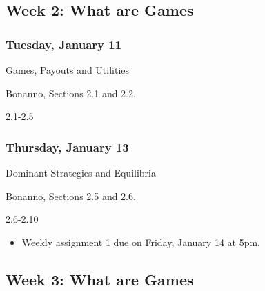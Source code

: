 \documentclass[
]{article}
\providecommand{\tightlist}{%
  \setlength{\itemsep}{0pt}\setlength{\parskip}{0pt}}
\begin{document}
\hypertarget{week-2-what-are-games}{%
\subsection{Week 2: What are Games}\label{week-2-what-are-games}}

\begin{multicols}{2}

\hypertarget{tuesday-january-11}{%
\subsubsection{Tuesday, January 11}\label{tuesday-january-11}}

\begin{description}
\tightlist
\item[Topic]
Games, Payouts and Utilities
\item[Reading]
Bonanno, Sections 2.1 and 2.2.
\item[Video lectures]
2.1-2.5
\end{description}

\hypertarget{thursday-january-13}{%
\subsubsection{Thursday, January 13}\label{thursday-january-13}}

\begin{description}
\tightlist
\item[Topic]
Dominant Strategies and Equilibria
\item[Reading]
Bonanno, Sections 2.5 and 2.6.
\item[Video lectures]
2.6-2.10
\end{description}

\end{multicols}

\begin{itemize}
\tightlist
\item
  Weekly assignment 1 due on Friday, January 14 at 5pm.
\end{itemize}

\hypertarget{week-3-what-are-games}{%
\subsection{Week 3: What are Games}\label{week-3-what-are-games}}
\end{document}
